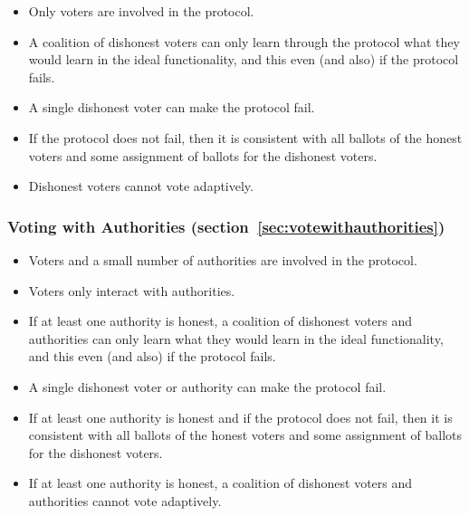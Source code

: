 \documentclass[runningheads]{llncs}
\begin{document}
\begin{itemize}
\item Only voters are involved in the protocol.
\item A coalition of dishonest voters can only learn through the protocol what they would learn in the
ideal functionality, and this even (and also) if the protocol fails.
\item A single dishonest voter can make the protocol fail.
\item If the protocol does not fail, then it is consistent with all ballots of the honest voters and
some assignment of ballots for the dishonest voters.
\item Dishonest voters cannot vote adaptively.
\end{itemize}

\subsubsection{Voting with Authorities (section~\ref{sec:votewithauthorities})}
\begin{itemize}
\item Voters and a small number of authorities are involved in the protocol.
\item Voters only interact with authorities.
\item If at least one authority is honest, a coalition of dishonest voters and authorities
can only learn
what they would learn in the
ideal functionality, and this even (and also) if the protocol fails.
\item A single dishonest voter or authority can make the protocol fail.
\item If at least one authority is honest and if the protocol does not fail, then
it is consistent with all ballots of the honest voters and some
assignment of ballots for the dishonest voters.
\item If at least one authority is honest, a coalition of dishonest voters and authorities cannot vote adaptively.
\end{itemize}
\end{document}
